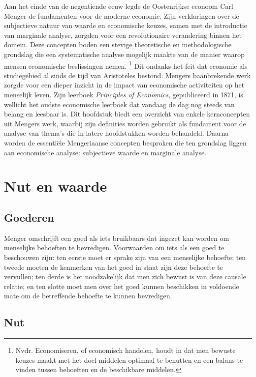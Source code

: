 \documentclass[
  a5paper,
  smalldemyvopaper,11pt,twoside,onecolumn,openright,extrafontsizes,
hidelinks]{memoir}
\begin{document}
Aan het einde van de negentiende eeuw legde de Oostenrijkse econoom Carl
Menger de fundamenten voor de moderne economie. Zijn verklaringen over
de subjectieve natuur van waarde en economische keuzes, samen met de
introductie van marginale analyse, zorgden voor een revolutionaire
verandering binnen het domein. Deze concepten boden een stevige
theoretische en methodologische grondslag die een systematische analyse
mogelijk maakte van de manier waarop mensen economische beslissingen
nemen. \footnote{Nvdr. Economiseren, of economisch handelen, houdt in
  dat men bewuste keuzes maakt met het doel middelen optimaal te
  benutten en een balans te vinden tussen behoeften en de beschikbare
  middelen.} Dit ondanks het feit dat economie als studiegebied al sinds
de tijd van Aristoteles bestond. Mengers baanbrekende werk zorgde voor
een dieper inzicht in de impact van economische activiteiten op het
menselijk leven. Zijn leerboek \emph{Principles of Economics},
gepubliceerd in 1871, is wellicht het oudste economische leerboek dat
vandaag de dag nog steeds van belang en leesbaar is. Dit hoofdstuk biedt
een overzicht van enkele kernconcepten uit Mengers werk, waarbij zijn
definities worden gebruikt als fundament voor de analyse van thema's die
in latere hoofdstukken worden behandeld. Daarna worden de essentiële
Mengeriaanse concepten besproken die ten grondslag liggen aan
economische analyse: subjectieve waarde en marginale analyse.

\section{Nut en waarde}\label{nut-en-waarde}

\subsection{Goederen}\label{goederen}

Menger omschrijft een goed als iets bruikbaars dat ingezet kan worden om
menselijke behoeften te bevredigen. Voorwaarden om iets als een goed te
beschouwen zijn: ten eerste moet er sprake zijn van een menselijke
behoefte; ten tweede moeten de kenmerken van het goed in staat zijn deze
behoefte te vervullen; ten derde is het noodzakelijk dat men zich bewust
is van deze causale relatie; en ten slotte moet men over het goed kunnen
beschikken in voldoende mate om de betreffende behoefte te kunnen
bevredigen.

\subsection{Nut}\label{nut}
\end{document}
